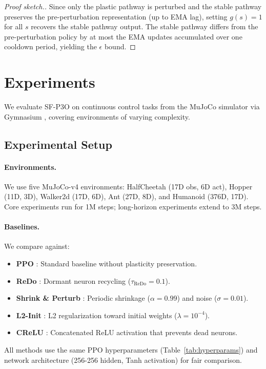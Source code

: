\documentclass{article}
\begin{document}
\begin{proof}[Proof sketch.]
Since only the plastic pathway is perturbed and the stable pathway preserves the pre-perturbation representation (up to EMA lag), setting $g(s) = 1$ for all $s$ recovers the stable pathway output. The stable pathway differs from the pre-perturbation policy by at most the EMA updates accumulated over one cooldown period, yielding the $\epsilon$ bound.
\end{proof}


\section{Experiments}
\label{sec:experiments}

We evaluate SF-P3O on continuous control tasks from the MuJoCo simulator \citep{todorov2012mujoco} via Gymnasium \citep{towers2024gymnasium}, covering environments of varying complexity.

\subsection{Experimental Setup}

\paragraph{Environments.}
We use five MuJoCo-v4 environments: HalfCheetah (17D obs, 6D act), Hopper (11D, 3D), Walker2d (17D, 6D), Ant (27D, 8D), and Humanoid (376D, 17D). Core experiments run for 1M steps; long-horizon experiments extend to 3M steps.

\paragraph{Baselines.}
We compare against:
\begin{itemize}
    \item \textbf{PPO} \citep{schulman2017ppo}: Standard baseline without plasticity preservation.
    \item \textbf{ReDo} \citep{sokar2023dormant}: Dormant neuron recycling ($\tau_{\text{ReDo}} = 0.1$).
    \item \textbf{Shrink \& Perturb} \citep{ash2020warm}: Periodic shrinkage ($\alpha=0.99$) and noise ($\sigma=0.01$).
    \item \textbf{L2-Init} \citep{kumar2023maintaining}: L2 regularization toward initial weights ($\lambda = 10^{-4}$).
    \item \textbf{CReLU} \citep{abbas2023loss}: Concatenated ReLU activation that prevents dead neurons.
\end{itemize}
All methods use the same PPO hyperparameters (Table~\ref{tab:hyperparams}) and network architecture (256-256 hidden, Tanh activation) for fair comparison.
\end{document}
